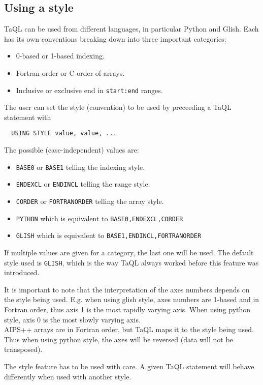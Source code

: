 \subsection{Using a style}
TaQL can be used from different languages, in particular Python and
Glish. Each has its own conventions breaking down into three important
categories: 
\begin{itemize}
\item 0-based or 1-based indexing.
\item Fortran-order or C-order of arrays.
\item Inclusive or exclusive end in \texttt{start:end} ranges.
\end{itemize}
The user can set the style (convention) to be used by preceeding a
TaQL statement with
\begin{verbatim}
  USING STYLE value, value, ...
\end{verbatim}
The possible (case-independent) values are:
\begin{itemize}
\item \texttt{BASE0} or \texttt{BASE1} telling the indexing style.
\item \texttt{ENDEXCL} or \texttt{ENDINCL} telling the range style.
\item \texttt{CORDER} or \texttt{FORTRANORDER} telling the array style.
\item \texttt{PYTHON} which is equivalent to \texttt{BASE0,ENDEXCL,CORDER}
\item \texttt{GLISH} which is equivalent to \texttt{BASE1,ENDINCL,FORTRANORDER}
\end{itemize}
If multiple values are given for a category, the last one will be used.
The default style used is \texttt{GLISH}, which is the way TaQL always
worked before this feature was introduced.

It is important to note that the interpretation of the axes numbers
depends on the style being used. E.g. when using glish style, axes numbers are
1-based and in Fortran order, thus axis 1 is the most rapidly varying
axis. When using python style, axis 0 is the most slowly varying axis.
\\AIPS++ arrays are in Fortran order, but TaQL maps it to the
style being used. Thus when using python style, the axes will be
reversed (data will not be transposed).

The style feature has to be used with care. A given TaQL statement will
behave differently when used with another style.

